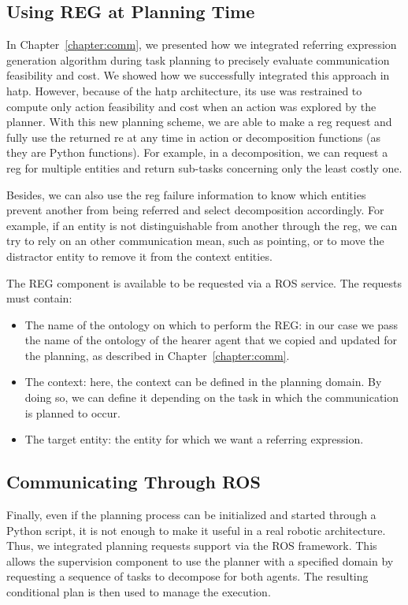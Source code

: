 \documentclass[a4paper,11pt,twoside]{StyleThese}
\begin{document}
\subsection{Using REG at Planning Time}
In Chapter~\ref{chapter:comm}, we presented how we integrated referring expression generation algorithm during task planning to precisely evaluate communication feasibility and cost. We showed how we successfully integrated this approach in \acrshort{hatp}. However, because of the \acrshort{hatp} architecture, its use was restrained to compute only action feasibility and cost when an action was explored by the planner.
With this new planning scheme, we are able to make a \acrshort{reg} request and fully use the returned \acrshort{re} at any time in action or decomposition functions (as they are Python functions). For example, in a decomposition, we can request a \acrshort{reg} for multiple entities and return sub-tasks concerning only the least costly one. 

Besides, we can also use the \acrshort{reg} failure information to know which entities prevent another from being referred and select decomposition accordingly. For example, if an entity is not distinguishable from another through the \acrshort{reg}, we can try to rely on an other communication mean, such as pointing, or to move the distractor entity to remove it from the context entities.

The REG component is available to be requested via a ROS service. The requests must contain:
\begin{itemize}
\item The name of the ontology on which to perform the REG: in our case we pass the name of the ontology of the hearer agent that we copied and updated for the planning, as described in Chapter~\ref{chapter:comm}.

\item The context: here, the context can be defined in the planning domain. By doing so, we can define it depending on the task in which the communication is planned to occur.

\item The target entity: the entity for which we want a referring expression.
\end{itemize}

\subsection{Communicating Through ROS}
Finally, even if the planning process can be initialized and started through a Python script, it is not enough to make it useful in a real robotic architecture. Thus, we integrated planning requests support via the ROS framework. This allows the supervision component to use the planner with a specified domain by requesting a sequence of tasks to decompose for both agents. The resulting conditional plan is then used to manage the execution.
\end{document}
